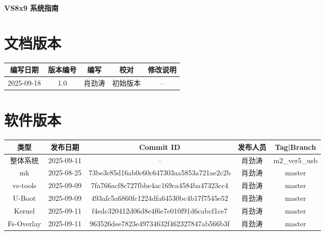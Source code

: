 \documentclass[UTF8]{ctexart}
\begin{document}
\pagestyle{empty}

\begin{center}
    \vspace*{2cm}
    {\Huge \textbf{VS8x9 系统指南}}
    \vspace{2cm}
\end{center}

\section*{文档版本}

\begin{center}
    \begin{tabular}{|*{5}{c|}} \hline
        编写日期 & 版本编号 & 编写 & 校对 & 修改说明 \\ \hline
        2025-09-18 & 1.0 & 肖劲涛  & 初始版本 & -- \\ \hline
    \end{tabular}
\end{center}

\vspace{1cm}

\section*{软件版本}

\begin{center}
    \begin{tabular}{|*{5}{c|}} \hline
        类型 & 发布日期 & Commit ID & 发布人员 & Tag|Branch \\ \hline
        整体系统 & 2025-09-11 & -- & 肖劲涛 & m2\_ver5\_usb  \\ \hline
        mk & 2025-08-25 & 73be3c85d16ab0c60c647303aa5853a721ae2c2b & 肖劲涛  & master \\ \hline
        vs-tools & 2025-09-09 & 7fa766acf8c727fbbe4ac169ca4584ba47323cc4 & 肖劲涛  & master \\ \hline
        U-Boot & 2025-09-09 & 493afc5a6860fc1224dfa64530bc4b17f7545e52 & 肖劲涛  & master \\ \hline
        Kernel & 2025-09-11 & f4edc320412d06d8e4f6e7e010f91d6cabcf1ce7 & 肖劲涛  & master \\ \hline
        Fs-Overlay & 2025-09-11 & 963526dee7823e49734632f462327847ab566b3f & 肖劲涛  & master \\ \hline
    \end{tabular}
\end{center}
\end{document}
